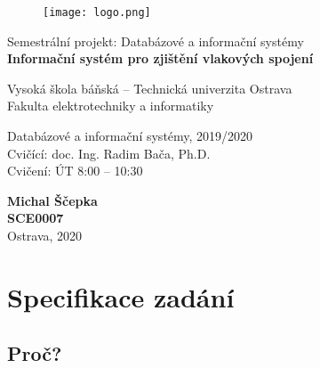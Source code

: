 \documentclass[11pt]{article}
\begin{document}

\begin{titlepage}
    \begin{center}

        \begin{figure}[H]
            \texttt{[image: logo.png]}
            \centering
        \end{figure}
 
        {\LARGE Semestrální projekt: Databázové a informační systémy}\\
        \vspace{0.25cm}
        {\Large \textbf{Informační systém pro zjištění vlakových spojení}}
 
        \vspace{1.5cm}

        Vysoká škola báňská – Technická univerzita Ostrava\\
        Fakulta elektrotechniky a informatiky\\
        
        \vfill
        \begin{multicols}{2}
            \begin{flushleft}
                Databázové a informační systémy, 2019/2020\\
                Cvičící: doc. Ing. Radim Bača, Ph.D.\\
                Cvičení: ÚT 8:00 – 10:30\\
            \end{flushleft}
            \begin{flushright}
                \textbf{Michal Ščepka}\\
                \textbf{SCE0007}\\
                Ostrava, 2020
            \end{flushright}
        \end{multicols}
    \end{center}
\end{titlepage}


\tableofcontents
\newpage

\section{Specifikace zadání}

\subsection{Proč?}
\end{document}
